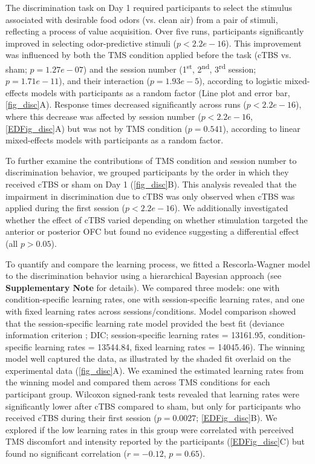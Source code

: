 \documentclass[lineno,sn-basic]{sn-jnl}%
\begin{document}
The discrimination task on Day 1 required participants to select the stimulus associated with desirable food odors (vs. clean air) from a pair of stimuli, reflecting a process of value acquisition. Over five runs, participants significantly improved in selecting odor-predictive stimuli ($p<2.2e-16$). This improvement was influenced by both the TMS condition applied before the task (cTBS vs. sham; $p = 1.27e-07$) and the session number (1\textsuperscript{st}, 2\textsuperscript{nd}, 3\textsuperscript{rd} session; $p = 1.71e-11$), and their interaction ($p = 1.93e-5$), according to logistic mixed-effects models with participants as a random factor (Line plot and error bar, \autoref{fig_disc}A). Response times decreased significantly across runs ($p<2.2e-16$), where this decrease was affected by session number ($p<2.2e-16$, \ref{EDFig_disc}A) but was not by TMS condition ($p = 0.541$), according to linear mixed-effects models with participants as a random factor.

To further examine the contributions of TMS condition and session number to discrimination behavior, we grouped participants by the order in which they received cTBS or sham on Day 1 (\autoref{fig_disc}B). This analysis revealed that the impairment in discrimination due to cTBS was only observed when cTBS was applied during the first session ($p<2.2e-16$). We additionally investigated whether the effect of cTBS varied depending on whether stimulation targeted the anterior or posterior OFC but found no evidence suggesting a differential effect (all $p>0.05$).

To quantify and compare the learning process, we fitted a Rescorla-Wagner model to the discrimination behavior using a hierarchical Bayesian approach \citep{RN630} (see \textbf{Supplementary Note} for details). We compared three models: one with condition-specific learning rates, one with session-specific learning rates, and one with fixed learning rates across sessions/conditions. Model comparison showed that the session-specific learning rate model provided the best fit (deviance information criterion \citep{RN159}; DIC; session-specific learning rates = 13161.95, condition-specific learning rates = 13544.84, fixed learning rates = 14045.46). The winning model well captured the data, as illustrated by the shaded fit overlaid on the experimental data (\autoref{fig_disc}A). We examined the estimated learning rates from the winning model and compared them across TMS conditions for each participant group. Wilcoxon signed-rank tests revealed that learning rates were significantly lower after cTBS compared to sham, but only for participants who received cTBS during their first session ($p = 0.0027$; \ref{EDFig_disc}B). We explored if the low learning rates in this group were correlated with perceived TMS discomfort and intensity reported by the participants (\ref{EDFig_disc}C) but found no significant correlation ($r = -0.12$, $p = 0.65$).
\end{document}
